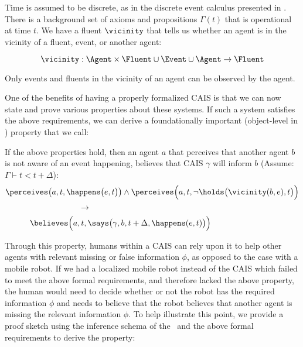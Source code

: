 Time is assumed to be discrete, as in the
discrete event calculus presented in \cite{mueller_commonsense_2014}.  There is a
background set of axioms and propositions $\Gamma(t)$ that is
operational at time $t$.  We have a fluent $\vicinity$ that tells us
whether an agent is in the vicinity of a fluent, event, or another
agent:

$$\vicinity: \Agent \times \Fluent \cup \Event \cup \Agent \rightarrow
\Fluent $$

\noindent
Only events and fluents in the vicinity of an agent can be
observed by the agent.


One of the benefits of having a properly formalized CAIS is that we
can now state and prove various properties about these systems. If such
a system satisfies the above requirements, we can derive a foundationally
important (object-level in \CEC) property that we call:

\begin{small}
\begin{mdframed}[linecolor=white,frametitle=Expectation of Usefulness , %
nobreak=true ,roundcorner=8pt]
  If the above properties hold, then an agent $a$ that perceives that
  another agent $b$ is not aware of an event happening, believes that
  CAIS $\gamma$ will inform $b$ (Assume: $\Gamma \vdash t < t + \Delta$):
\begin{equation*}
\begin{aligned}
&\perceives\big(a, t, \happens\big(e, t\big)\big) \land \perceives\Big(a, t, \lnot \holds\big(\vicinity(b, e),t\big)\Big) \\
& \hspace{90pt} \rightarrow \\
& \hspace{30pt} \believes\Big(a, t, \says\big(\gamma, b, t +\Delta,
\happens(e, t)\big)\Big)\\
\end{aligned}
\end{equation*}
\end{mdframed}
\end{small}

Through this property, humans within a CAIS can rely upon it to help other
agents with relevant missing or false information $\phi$, as opposed to the
case with a mobile robot. If we had a localized mobile robot instead of the
CAIS which failed to meet the above formal requirements, and therefore lacked
the above property, the human would need to decide whether or not the robot has
the required information $\phi$ and needs to believe that the robot believes that
another agent is missing the relevant information $\phi$. To help illustrate this
point, we provide a proof sketch using the inference schema of the \CEC\ and
the above formal requirements to derive the property:

